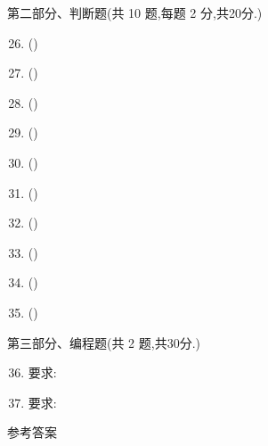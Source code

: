 \documentclass[11pt]{ctexart}
\begin{document}
    \vspace{1cm}
    {\noindent\heiti 第二部分、判断题(共 10 题,每题 2 分,共20分.)}
    \begin{enumerate}
        \setcounter{enumi}{25}
        \item (\qquad)

        \item (\qquad)
        
        \item (\qquad)
  
        \item (\qquad)
        
        \item (\qquad)
        
        \item (\qquad)
        
        \item (\qquad)
        
        \item (\qquad)
        
        \item (\qquad)
        
        \item (\qquad)
    \end{enumerate}

    \newpage
    {\noindent\heiti 第三部分、编程题(共 2 题,共30分.)}
    \begin{enumerate}
        \setcounter{enumi}{35}
        
        \item 要求:
        \begin{tasks}[label = (\arabic*)]
            \task 
            \task 
        \end{tasks}
        \vfill

        \item 要求:
        \begin{tasks}[label = (\arabic*)]
            \task 
            \task 
            \task 
        \end{tasks}
        \vfill
    \end{enumerate}

    \newpage
    \begin{center}
        \Huge \heiti 参考答案
    \end{center}
\end{document}
